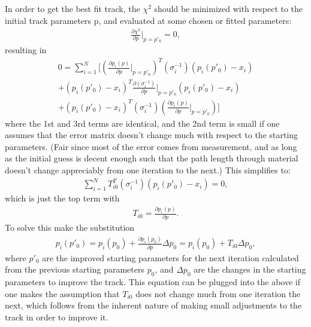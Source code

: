     In order to get the best fit track, the $\chi^{2}$ should be minimized with respect to the initial track parameters p, and evaluated at some chosen or fitted parameters:
        \begin{align} \label{eq:minimize}
            \frac{\partial \chi^{2}}{\partial p}|_{p=p'_{0}} = 0,
        \end{align}
    resulting in
        \begin{equation}
        \begin{aligned}
            0 = \sum_{i=1}^{N}[ (\frac{\partial p_{i}(p)}{\partial p}|_{p=p'_{0}})^{T} (\sigma_{i}^{-1}) (p_{i}(p'_{0})-x_{i}) \\ 
            + (p_{i}(p'_{0})-x_{i})^{T} \frac{\partial(\sigma_{i}^{-1})}{\partial p}|_{p=p'_{0}} (p_{i}(p'_{0})-x_{i}) \\ 
            +  (p_{i}(p'_{0})-x_{i})^{T} (\sigma_{i}^{-1}) (\frac{\partial p_{i}(p)}{\partial p}|_{p=p'_{0}})]
        \end{aligned}
        \end{equation}
    where the 1st and 3rd terms are identical, and the 2nd term is small if one assumes that the error matrix doesn't change much with respect to the starting parameters. (Fair since most of the error comes from measurement, and as long as the initial guess is decent enough such that the path length through material doesn't change appreciably from one iteration to the next.) This simplifies to: 
        \begin{align} \label{eq:solve}
            \sum_{i=1}^{N} T^{T}_{i0} (\sigma_{i}^{-1}) (p_{i}(p'_{0})-x_{i}) = 0,
        \end{align}
    which is just the top term with 
        \begin{align} \label{eq:transport2}
             T_{i0} = \frac{\partial p_{i}(p)}{\partial p}.
        \end{align}
    To solve this make the substitution 
        \begin{align} \label{eq:psub}
            p_{i}(p'_{0}) = p_{i}(p_{0}) + \frac{\partial p_{i}(p_{0})}{\partial p} \Delta p_{0} = p_{i}(p_{0}) + T_{i0} \Delta p_{0},
        \end{align}
    where $p'_{0}$ are the improved starting parameters for the next iteration calculated from the previous starting parameters $p_{0}$, and $\Delta p_{0}$ are the changes in the starting parameters to improve the track. This equation can be plugged into the above if one makes the assumption that $T_{i0}$ does not change much from one iteration the next, which follows from the inherent nature of making small adjustments to the track in order to improve it.

